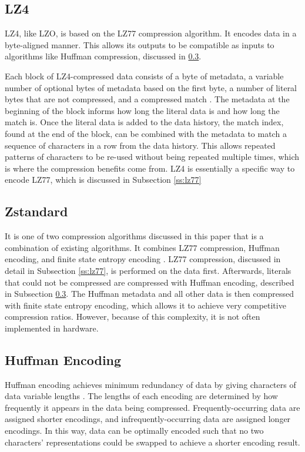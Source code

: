 \documentclass[doublespace,nopageskip]{VTthesis}
\begin{document}
\subsection{LZ4}\label{ss:lz4}
LZ4, like LZO, is based on the LZ77 compression algorithm. It encodes data in a byte-aligned manner. This allows its outputs to be compatible as inputs to algorithms like Huffman compression, discussed in \ref{ss:huffman_encoding}.

Each block of LZ4-compressed data consists of a byte of metadata, a variable number of optional bytes of metadata based on the first byte, a number of literal bytes that are not compressed, and a compressed match \cite{lz4}. The metadata at the beginning of the block informs how long the literal data is and how long the match is. Once the literal data is added to the data history, the match index, found at the end of the block, can be combined with the metadata to match a sequence of characters in a row from the data history. This allows repeated patterns of characters to be re-used without being repeated multiple times, which is where the compression benefits come from. LZ4 is essentially a specific way to encode LZ77, which is discussed in Subsection \ref{ss:lz77}

\subsection{Zstandard}\label{ss:zstandard}
It is one of two compression algorithms discussed in this paper that is a combination of existing algorithms. It combines LZ77 compression, Huffman encoding, and finite state entropy encoding \cite{zstd}. LZ77 compression, discussed in detail in Subsection \ref{ss:lz77}, is performed on the data first. Afterwards, literals that could not be compressed are compressed with Huffman encoding, described in Subsection \ref{ss:huffman_encoding}. The Huffman metadata and all other data is then compressed with finite state entropy encoding, which allows it to achieve very competitive compression ratios. However, because of this complexity, it is not often implemented in hardware. 

\subsection{Huffman Encoding}\label{ss:huffman_encoding}
Huffman encoding achieves minimum redundancy of data by giving characters of data variable lengths \cite{huffman}. The lengths of each encoding are determined by how frequently it appears in the data being compressed. Frequently-occurring data are assigned shorter encodings, and infrequently-occurring data are assigned longer encodings. In this way, data can be optimally encoded such that no two characters' representations could be swapped to achieve a shorter encoding result. 
\end{document}
